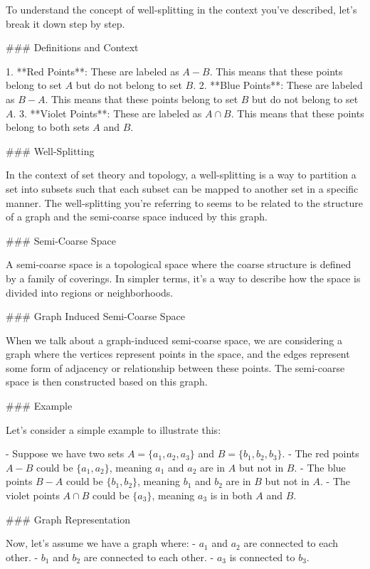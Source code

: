 To understand the concept of well-splitting in the context you've described, let's break it down step by step.

### Definitions and Context

1. **Red Points**: These are labeled as \( A - B \). This means that these points belong to set \( A \) but do not belong to set \( B \).
2. **Blue Points**: These are labeled as \( B - A \). This means that these points belong to set \( B \) but do not belong to set \( A \).
3. **Violet Points**: These are labeled as \( A \cap B \). This means that these points belong to both sets \( A \) and \( B \).

### Well-Splitting

In the context of set theory and topology, a well-splitting is a way to partition a set into subsets such that each subset can be mapped to another set in a specific manner. The well-splitting you're referring to seems to be related to the structure of a graph and the semi-coarse space induced by this graph.

### Semi-Coarse Space

A semi-coarse space is a topological space where the coarse structure is defined by a family of coverings. In simpler terms, it's a way to describe how the space is divided into regions or neighborhoods.

### Graph Induced Semi-Coarse Space

When we talk about a graph-induced semi-coarse space, we are considering a graph where the vertices represent points in the space, and the edges represent some form of adjacency or relationship between these points. The semi-coarse space is then constructed based on this graph.

### Example

Let's consider a simple example to illustrate this:

- Suppose we have two sets \( A = \{a_1, a_2, a_3\} \) and \( B = \{b_1, b_2, b_3\} \).
- The red points \( A - B \) could be \( \{a_1, a_2\} \), meaning \( a_1 \) and \( a_2 \) are in \( A \) but not in \( B \).
- The blue points \( B - A \) could be \( \{b_1, b_2\} \), meaning \( b_1 \) and \( b_2 \) are in \( B \) but not in \( A \).
- The violet points \( A \cap B \) could be \( \{a_3\} \), meaning \( a_3 \) is in both \( A \) and \( B \).

### Graph Representation

Now, let's assume we have a graph where:
- \( a_1 \) and \( a_2 \) are connected to each other.
- \( b_1 \) and \( b_2 \) are connected to each other.
- \( a_3 \) is connected to \( b_3 \).

